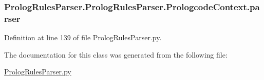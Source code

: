 \subsubsection[{parser}]{\setlength{\rightskip}{0pt plus 5cm}Prolog\+Rules\+Parser.\+Prolog\+Rules\+Parser.\+Prologcode\+Context.\+parser}\label{class_prolog_rules_parser_1_1_prolog_rules_parser_1_1_prologcode_context_aec10e505a5b74230b5f4b49a9d7da40a}


Definition at line 139 of file Prolog\+Rules\+Parser.\+py.



The documentation for this class was generated from the following file\+:\begin{DoxyCompactItemize}
\item 
\hyperlink{_prolog_rules_parser_8py}{Prolog\+Rules\+Parser.\+py}\end{DoxyCompactItemize}
